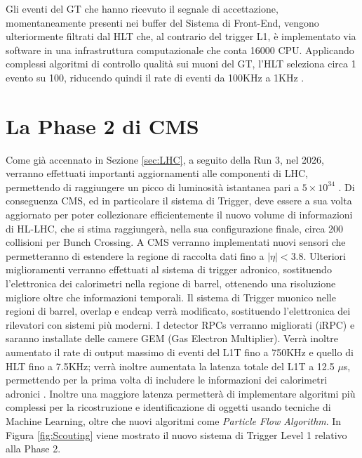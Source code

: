 Gli eventi del GT che hanno ricevuto il segnale di accettazione, momentaneamente presenti nei buffer del Sistema di Front-End, vengono ulteriormente filtrati dal HLT che, al contrario del trigger L1, è implementato via software in una infrastruttura computazionale che conta 16000 CPU. \newline
Applicando complessi algoritmi di controllo qualità sui muoni del GT, l'HLT seleziona circa 1 evento su 100, riducendo quindi il rate di eventi da 100KHz a 1KHz \cite{MasterThesisNicLai}.


\section{La Phase 2 di CMS}
\label{sec:Phase2}

Come già accennato in Sezione \ref{sec:LHC}, a seguito della Run 3, nel 2026, verranno effettuati importanti aggiornamenti alle componenti di LHC, permettendo di raggiungere un picco di luminosità istantanea pari a $5 \times 10^{34}$ \Lumi. Di conseguenza CMS, ed in particolare il sistema di Trigger, deve essere a sua volta aggiornato per poter collezionare efficientemente il nuovo volume di informazioni di HL-LHC, che si stima raggiungerà, nella sua configurazione finale, circa 200 collisioni per Bunch Crossing. A CMS verranno implementati nuovi sensori che permetteranno di estendere la regione di raccolta dati fino a $|\eta| < 3.8$. Ulteriori miglioramenti verranno effettuati al sistema di trigger adronico, sostituendo l'elettronica dei calorimetri nella regione di barrel, ottenendo una risoluzione migliore oltre che informazioni temporali. \newline
Il sistema di Trigger muonico nelle regioni di barrel, overlap e endcap verrà modificato, sostituendo l'elettronica dei rilevatori con sistemi più moderni. I detector RPCs verranno migliorati (iRPC) e saranno installate delle camere GEM (Gas Electron Multiplier). \newline
Verrà inoltre aumentato il rate di output massimo di eventi del L1T fino a 750KHz e quello di HLT fino a 7.5KHz; verrà inoltre aumentata la latenza totale del L1T a 12.5 $\mu$s, permettendo per la prima volta di includere le informazioni dei calorimetri adronici \cite{collaboration2021phase}. Inoltre una maggiore latenza permetterà di implementare algoritmi più complessi per la ricostruzione e identificazione di oggetti usando tecniche di Machine Learning, oltre che nuovi algoritmi come \textit{Particle Flow Algorithm}. In Figura \ref{fig:Scouting} viene mostrato il nuovo sistema di Trigger Level 1 relativo alla Phase 2.

